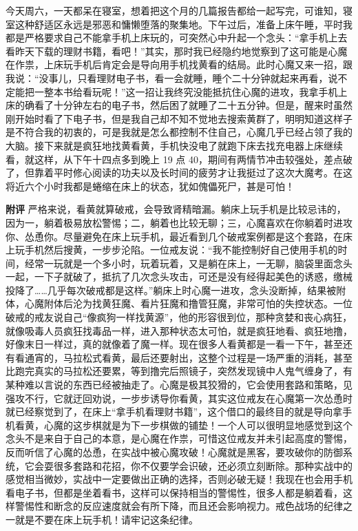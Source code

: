 \begin{case}
    今天周六，一天都呆在寝室，想着把这个月的几篇报告都给一起写完，可谁知，寝室这种舒适区永远是邪恶和慵懒堕落的聚集地。下午过后，准备上床午睡，平时我都是严格要求自己不能拿手机上床玩的，可突然心中升起一个念头：“拿手机上去看昨天下载的理财书籍，看吧！”其实，那时我已经隐约地觉察到了这可能是心魔在作祟，上床玩手机后肯定会是导向用手机找黄看的结局。此时心魔又来一招，跟我说：“没事儿，只看理财电子书，看一会就睡，睡个二十分钟就起来再看，说不定能把一整本书给看玩呢！”这一招让我终究没能抵抗住心魔的进攻，我拿手机上床的确看了十分钟左右的电子书，然后困了就睡了二十五分钟。但是，醒来时虽然刚开始时看了下电子书，但是我自己却不知不觉地去搜索黄群了，明明知道这样子是不符合我的初衷的，可是我就是怎么都控制不住自己，心魔几乎已经占领了我的大脑。接下来就是疯狂地找黄看黄，手机快没电了就跑下床去找充电器上床继续看，就这样，从下午十四点多到晚上 19 点 40，期间有两情节冲击较强处，差点破了，但靠着平时修心阅读的功夫以及长时间的疲劳才让我挺过了这次大魔考。在这将近六个小时我都是蜷缩在床上的状态，犹如傀儡死尸，甚是可怕！

    \textbf{附评} 严格来说，看黄就算破戒，会导致肾精暗漏。躺床上玩手机是比较忌讳的，因为一，躺着极易放松警惕；二，躺着也比较无聊；三，心魔喜欢在你躺着时进攻你、怂恿你。尽量避免在床上玩手机，最近看到几个破戒案例都是这个套路，在床上玩手机然后搜黄，一步步沦陷。一位戒友说：“我不能控制好自己使用手机的时间，经常一玩就是一个多小时，玩着玩着，又是躺在床上，一无聊，脑袋里面念头一起，一下子就破了，抵抗了几次念头攻击，可还是没有经得起美色的诱惑，缴械投降了……几乎每次破戒都是这样。”躺床上时心魔一进攻，念头没断掉，结果被附体，心魔附体后沦为找黄狂魔、看片狂魔和撸管狂魔，非常可怕的失控状态。一位破戒的戒友说自己“像疯狗一样找黄源”，他的形容很到位，那种贪婪和丧心病狂，就像吸毒人员疯狂找毒品一样，进入那种状态太可怕，就是疯狂地看、疯狂地撸，好像末日一样过，真的就像着了魔一样。现在很多人看黄都是一看一下午，甚至还有看通宵的，马拉松式看黄，最后还要射出，这整个过程是一场严重的消耗，甚至比跑完真实的马拉松还要累，等到撸完后照镜子，突然发现镜中人鬼气缠身了，有某种难以言说的东西已经被抽走了。心魔是极其狡猾的，它会使用套路和策略，见强攻不行，它就迂回劝说，一步步诱导你看黄，其实这位戒友在心魔第一次怂恿时就已经察觉到了，在床上“拿手机看理财书籍”，这个借口的最终目的就是导向拿手机看黄，心魔的这步棋就是为下一步棋做的铺垫！一个人可以很明显地感觉到这个念头不是来自于自己的本意，是心魔在作祟，可惜这位戒友并未引起高度的警惕，反而听信了心魔的怂恿，在实战中被心魔攻破！心魔就是黑客，要攻破你的防御系统，它会耍很多套路和花招，你不仅要学会识破，还必须立刻断除。那种实战中的感觉相当微妙，实战中一定要做出正确的选择，否则必破无疑！我现在也会用手机看电子书，但都是坐着看书，这样可以保持相当的警惕性，很多人都是躺着看，这样警惕性和断念的反应速度就会有所下降，而且还会影响视力。戒色战场的纪律之一就是不要在床上玩手机！请牢记这条纪律。
\end{case}

